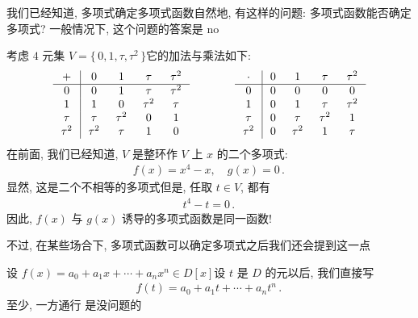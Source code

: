 \begin{remark}
    我们已经知道, 多项式确定多项式函数\period 自然地, 有这样的问题: 多项式函数能否确定多项式? 一般情况下, 这个问题的答案是 no\period

    考虑 $4$ 元集 $V = \{\, 0,1,\tau,\tau^2 \,\}$\period 它的加法与乘法如下:
    \begin{align*}
        \arraycolsep=0.25cm
        \begin{array}{c|cccc}
            +      & 0      & 1      & \tau   & \tau^2 \\ \hline
            0      & 0      & 1      & \tau   & \tau^2 \\
            1      & 1      & 0      & \tau^2 & \tau   \\
            \tau   & \tau   & \tau^2 & 0      & 1      \\
            \tau^2 & \tau^2 & \tau   & 1      & 0      \\
        \end{array}
        \qquad \qquad
        \begin{array}{c|cccc}
            \cdot  & 0 & 1      & \tau   & \tau^2 \\ \hline
            0      & 0 & 0      & 0      & 0      \\
            1      & 0 & 1      & \tau   & \tau^2 \\
            \tau   & 0 & \tau   & \tau^2 & 1      \\
            \tau^2 & 0 & \tau^2 & 1      & \tau   \\
        \end{array}
    \end{align*}
    在前面, 我们已经知道, $V$ 是整环\period 作 $V$ 上 $x$ 的二个多项式:
    \begin{align*}
        f(x) = x^4 - x, \quad g(x) = 0 \period
    \end{align*}
    显然, 这是二个不相等的多项式\period 但是, 任取 $t \in V$, 都有
    \begin{align*}
        t^4 - t = 0 \period
    \end{align*}
    因此, $f(x)$ 与 $g(x)$ 诱导的多项式函数是同一函数!

    不过, 在某些场合下, 多项式函数可以确定多项式\period 之后我们还会提到这一点\period
\end{remark}

\begin{remark}
    设 $f(x) = a_0 + a_1 x + \cdots + a_n x^n \in D[x]$\period 设 $t$ 是 $D$ 的元\period 以后, 我们直接写
    \begin{align*}
        f(t) = a_0 + a_1 t + \cdots + a_n t^n \period
    \end{align*}
    至少, 一方通行  是没问题的\period
\end{remark}

